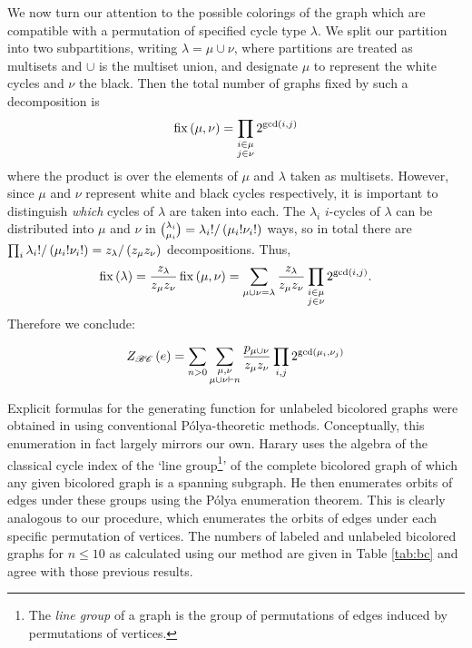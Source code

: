 \documentclass[sectionflow,singlespace,twoside,boldmathhdr]{brandiss} %
\numberwithin{section}{chapter}
\numberwithin{figure}{chapter}
\begin{document}
We now turn our attention to the possible colorings of the graph which are compatible with a permutation of specified cycle type $\lambda$.
We split our partition into two subpartitions, writing $\lambda = \mu \cup \nu$, where partitions are treated as multisets and $\cup$ is the multiset union, and designate $\mu$ to represent the white cycles and $\nu$ the black.
Then the total number of graphs fixed by such a decomposition is
\begin{equation*}
  \operatorname{fix} \left( {\mu, \nu} \right) = \prod_{\substack{i \in \mu \\ j \in \nu}} 2^{\gcd \left( {i, j} \right)}
\end{equation*}
where the product is over the elements of $\mu$ and $\lambda$ taken as multisets.
However, since $\mu$ and $\nu$ represent white and black cycles respectively, it is important to distinguish \emph{which} cycles of $\lambda$ are taken into each.
The $\lambda_{i}$ $i$-cycles of $\lambda$ can be distributed into $\mu$ and $\nu$ in $\binom{\lambda_{i}}{\mu_{i}} = \lambda_{i}! / \left( {\mu_{i}! \nu_{i}!} \right)$ ways, so in total there are $\prod_{i} \lambda_{i}! / \left( {\mu_{i}! \nu_{i}!} \right) = z_{\lambda} / \left( {z_{\mu} z_{\nu}} \right)$ decompositions.
Thus,
\begin{equation*}
  \operatorname{fix} \left( {\lambda} \right) = \frac{z_{\lambda}}{z_{\mu} z_{\nu}} \operatorname{fix} \left( {\mu, \nu} \right) = \sum_{\mu \cup \nu = \lambda} \frac{z_{\lambda}}{z_{\mu} z_{\nu}} \prod_{\substack{i \in \mu \\ j \in \nu}} 2^{\gcd \left( {i, j} \right)}.
\end{equation*}
Therefore we conclude:
\begin{theorem}
  \begin{equation}
    \label{eq:ecibc}
    Z_{\mathscr{BC}} \left( {e} \right) = \sum_{n > 0} \sum_{\substack{\mu, \nu \\ \mu \cup \nu \vdash n}} \frac{p_{\mu \cup \nu}}{z_{\mu} z_{\nu}} \prod_{i, j} 2^{\gcd \left( {\mu_{i}, \nu_{j}} \right)}
  \end{equation}
\end{theorem}

Explicit formulas for the generating function for unlabeled bicolored graphs were obtained in \cite{har:bicolored} using conventional P\'{o}lya-theoretic methods.
Conceptually, this enumeration in fact largely mirrors our own.
Harary uses the algebra of the classical cycle index of the `line group\footnote{The \emph{line group} of a graph is the group of permutations of edges induced by permutations of vertices.}' of the complete bicolored graph of which any given bicolored graph is a spanning subgraph.
He then enumerates orbits of edges under these groups using the P\'{o}lya enumeration theorem.
This is clearly analogous to our procedure, which enumerates the orbits of edges under each specific permutation of vertices.
The numbers of labeled and unlabeled bicolored graphs for $n \leq 10$ as calculated using our method are given in Table \ref{tab:bc} and agree with those previous results.
\end{document}
